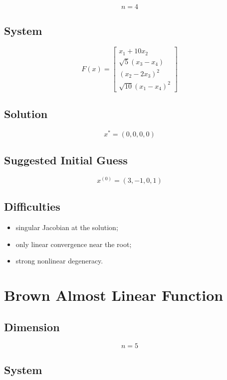 \documentclass[11pt,a4paper]{article}
\begin{document}
\[
n=4
\]

\subsection*{System}

\[
F(x)=
\begin{bmatrix}
x_1+10x_2 \\
\sqrt5(x_3-x_4) \\
(x_2-2x_3)^2 \\
\sqrt{10}(x_1-x_4)^2
\end{bmatrix}
\]

\subsection*{Solution}

\[
x^*=(0,0,0,0)
\]

\subsection*{Suggested Initial Guess}

\[
x^{(0)}=(3,-1,0,1)
\]

\subsection*{Difficulties}

\begin{itemize}
  \item singular Jacobian at the solution;
  \item only linear convergence near the root;
  \item strong nonlinear degeneracy.
\end{itemize}

\section{Brown Almost Linear Function}

\subsection*{Dimension}

\[
n=5
\]

\subsection*{System}
\end{document}
